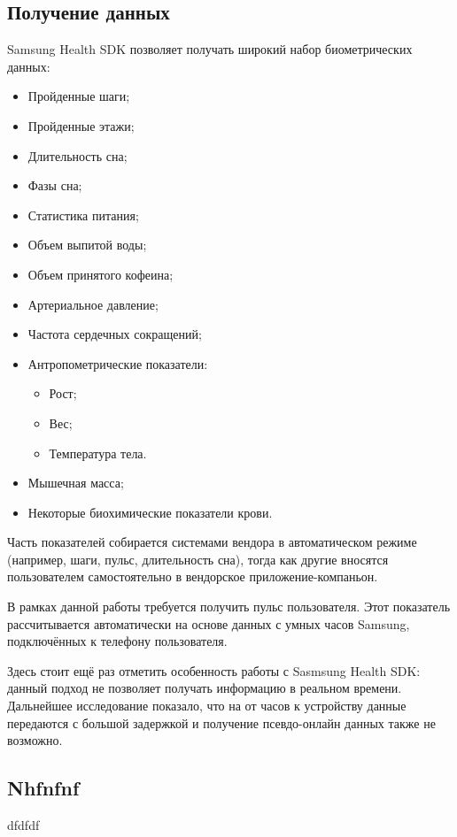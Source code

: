 \subsection{Получение данных}
Samsung Health SDK позволяет получать широкий набор биометрических данных:
\begin{multicols}{2}
	\begin{itemize}
		\item Пройденные шаги;
		\item Пройденные этажи;
		\item Длительность сна;
		\item Фазы сна;
		\item Статистика питания;
		\item Объем выпитой воды;
		\item Объем принятого кофеина;
		\item Артериальное давление;
		\item Частота сердечных сокращений;
		\item Антропометрические показатели:
		\begin{itemize}
			\item Рост;
			\item Вес;
			\item Температура тела.
		\end{itemize}
		\item Мышечная масса;
		\item Некоторые биохимические показатели крови.
	\end{itemize}
\end{multicols}
\smallskip
Часть показателей собирается системами вендора в автоматическом режиме (например, шаги, пульс, длительность сна), тогда как другие \textemdash\space вносятся пользователем самостоятельно в вендорское приложение-компаньон.

В рамках данной работы требуется получить пульс пользователя. Этот показатель рассчитывается автоматически на основе данных с умных часов Samsung, подключённых к телефону пользователя.

Здесь стоит ещё раз отметить особенность работы с Sasmsung Health SDK: данный подход не позволяет получать информацию в реальном времени. Дальнейшее исследование показало, что на от часов к устройству данные передаются с большой задержкой и получение псевдо-онлайн данных также не возможно.

\subsection{Nhfnfnf}
dfdfdf
